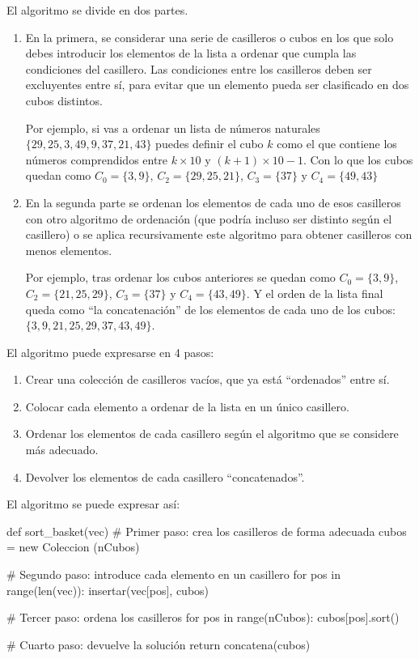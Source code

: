 El algoritmo se divide en dos partes.

\begin{enumerate}
\item En la primera, se considerar una serie de casilleros o cubos en los que solo debes introducir los elementos de la lista a ordenar que cumpla las condiciones del casillero. Las condiciones entre los casilleros deben ser excluyentes entre sí, para evitar que un elemento pueda ser clasificado en dos cubos distintos.  

Por ejemplo, si vas a ordenar un lista de números naturales $\{29,25,3,49,9,37,21,43\}$  puedes definir el cubo $k$ como el que contiene los números comprendidos entre $k\times 10$ y $(k+1)\times 10 -1$. Con lo que los cubos quedan como $C_0=\{3,9\}$, $C_2=\{29,25,21\}$, $C_3=\{37\}$ y $C_4=\{49,43\}$

\item En la segunda parte se ordenan los elementos de cada uno de esos casilleros con otro algoritmo de ordenación (que podría incluso ser distinto según el casillero) o se aplica recursivamente este algoritmo para obtener casilleros con menos elementos. 

Por ejemplo, tras ordenar los cubos anteriores se quedan como $C_0=\{3,9\}$, $C_2=\{21, 25, 29\}$, $C_3=\{37\}$ y $C_4=\{43,49\}$. Y el orden de la lista final queda como ``la concatenación'' de los elementos de cada uno de los cubos: 
$\{3,9, 21, 25, 29, 37,43,49\}$.
\end{enumerate}

El algoritmo puede expresarse en 4 pasos:
\begin{enumerate}
\item Crear una colección de casilleros vacíos, que ya está ``ordenados'' entre sí.
\item Colocar cada elemento a ordenar de la lista en un único casillero.
\item Ordenar los elementos de cada casillero según el algoritmo que se considere más adecuado.
\item Devolver los elementos de cada casillero ``concatenados''.
\end{enumerate}



El algoritmo se puede expresar así:
\begin{pyverbatim}[][frame=single]
def sort_basket(vec)
  # Primer paso: crea los casilleros de forma adecuada
  cubos = new Coleccion (nCubos) 

  # Segundo paso: introduce cada elemento en un casillero
  for pos in range(len(vec)):
    insertar(vec[pos], cubos)

  # Tercer paso: ordena los casilleros
  for pos in range(nCubos):
    cubos[pos].sort()
    
  # Cuarto paso: devuelve la solución
  return concatena(cubos)
\end{pyverbatim}



